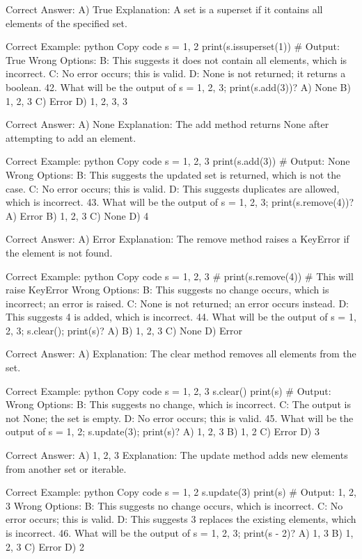 Correct Answer: A) True
Explanation: A set is a superset if it contains all elements of the specified set.

Correct Example:
python
Copy code
s = {1, 2}
print(s.issuperset({1}))  # Output: True
Wrong Options:
B: This suggests it does not contain all elements, which is incorrect.
C: No error occurs; this is valid.
D: None is not returned; it returns a boolean.
42. What will be the output of s = {1, 2, 3}; print(s.add(3))?
A) None
B) {1, 2, 3}
C) Error
D) {1, 2, 3, 3}

Correct Answer: A) None
Explanation: The add method returns None after attempting to add an element.

Correct Example:
python
Copy code
s = {1, 2, 3}
print(s.add(3))  # Output: None
Wrong Options:
B: This suggests the updated set is returned, which is not the case.
C: No error occurs; this is valid.
D: This suggests duplicates are allowed, which is incorrect.
43. What will be the output of s = {1, 2, 3}; print(s.remove(4))?
A) Error
B) {1, 2, 3}
C) None
D) {4}

Correct Answer: A) Error
Explanation: The remove method raises a KeyError if the element is not found.

Correct Example:
python
Copy code
s = {1, 2, 3}
# print(s.remove(4))  # This will raise KeyError
Wrong Options:
B: This suggests no change occurs, which is incorrect; an error is raised.
C: None is not returned; an error occurs instead.
D: This suggests 4 is added, which is incorrect.
44. What will be the output of s = {1, 2, 3}; s.clear(); print(s)?
A) {}
B) {1, 2, 3}
C) None
D) Error

Correct Answer: A) {}
Explanation: The clear method removes all elements from the set.

Correct Example:
python
Copy code
s = {1, 2, 3}
s.clear()
print(s)  # Output: {}
Wrong Options:
B: This suggests no change, which is incorrect.
C: The output is not None; the set is empty.
D: No error occurs; this is valid.
45. What will be the output of s = {1, 2}; s.update({3}); print(s)?
A) {1, 2, 3}
B) {1, 2}
C) Error
D) {3}

Correct Answer: A) {1, 2, 3}
Explanation: The update method adds new elements from another set or iterable.

Correct Example:
python
Copy code
s = {1, 2}
s.update({3})
print(s)  # Output: {1, 2, 3}
Wrong Options:
B: This suggests no change occurs, which is incorrect.
C: No error occurs; this is valid.
D: This suggests 3 replaces the existing elements, which is incorrect.
46. What will be the output of s = {1, 2, 3}; print(s - {2})?
A) {1, 3}
B) {1, 2, 3}
C) Error
D) {2}

